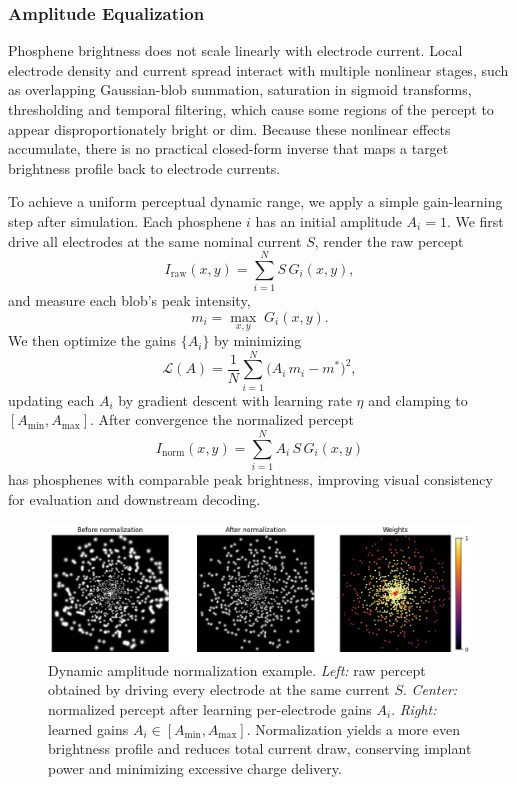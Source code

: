 \subsubsection{Amplitude Equalization}
Phosphene brightness does not scale linearly with electrode current. Local electrode density and current spread interact with multiple nonlinear stages, such as overlapping Gaussian-blob summation, saturation in sigmoid transforms, thresholding and temporal filtering, which cause some regions of the percept to appear disproportionately bright or dim. Because these nonlinear effects accumulate, there is no practical closed-form inverse that maps a target brightness profile back to electrode currents.

To achieve a uniform perceptual dynamic range, we apply a simple gain-learning step after simulation. Each phosphene \(i\) has an initial amplitude \(A_i=1\). We first drive all electrodes at the same nominal current \(S\), render the raw percept
\[
I_{\mathrm{raw}}(x,y)
=
\sum_{i=1}^N S\,G_i(x,y),
\]
and measure each blob’s peak intensity,
\[
m_i = \max_{x,y}\;G_i(x,y).
\]
We then optimize the gains \(\{A_i\}\) by minimizing
\[
\mathcal{L}(A)
=
\frac{1}{N}\sum_{i=1}^N \bigl(A_i\,m_i - m^*\bigr)^2,
\]
updating each \(A_i\) by gradient descent with learning rate \(\eta\) and clamping to \([A_{\min},A_{\max}]\). After convergence the normalized percept
\[
I_{\mathrm{norm}}(x,y)
=
\sum_{i=1}^N A_i\,S\,G_i(x,y)
\]
has phosphenes with comparable peak brightness, improving visual consistency for evaluation and downstream decoding.

\begin{figure}[ht]
  \centering
  \includegraphics[width=0.9\columnwidth]{figures/dynamicamplitudenorm.png}
  \caption{Dynamic amplitude normalization example.  
    \emph{Left:} raw percept obtained by driving every electrode at the same current \(S\).  
    \emph{Center:} normalized percept after learning per-electrode gains \(A_i\).  
    \emph{Right:} learned gains \(A_i\in[A_{\min},A_{\max}]\).  
    Normalization yields a more even brightness profile and reduces total current draw, conserving implant power and minimizing excessive charge delivery.}
  \label{fig:amplitude_norm}
\end{figure}

